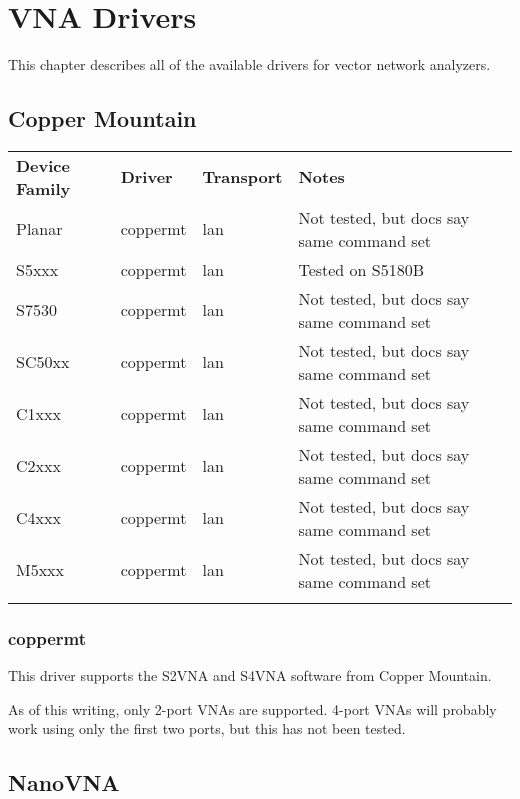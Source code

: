 \chapter{VNA Drivers}
\label{sec:vna-drivers}

This chapter describes all of the available drivers for vector network analyzers.

\section{Copper Mountain}

\begin{tabularx}{16cm}{lllX}
\thickhline
\textbf{Device Family} & \textbf{Driver} & \textbf{Transport} & \textbf{Notes} \\
\thickhline
Planar & coppermt & lan & Not tested, but docs say same command set \\
\thinhline
S5xxx  & coppermt & lan & Tested on S5180B \\
\thinhline
S7530 & coppermt & lan & Not tested, but docs say same command set \\
\thinhline
SC50xx & coppermt & lan & Not tested, but docs say same command set \\
\thinhline
C1xxx & coppermt & lan & Not tested, but docs say same command set \\
\thinhline
C2xxx & coppermt & lan & Not tested, but docs say same command set \\
\thinhline
C4xxx & coppermt & lan & Not tested, but docs say same command set \\
\thinhline
M5xxx & coppermt & lan & Not tested, but docs say same command set \\
\thickhline
\end{tabularx}

\subsection{coppermt}

This driver supports the S2VNA and S4VNA software from Copper Mountain.

As of this writing, only 2-port VNAs are supported. 4-port VNAs will probably work using only the first two ports,
but this has not been tested.

\section{NanoVNA}

